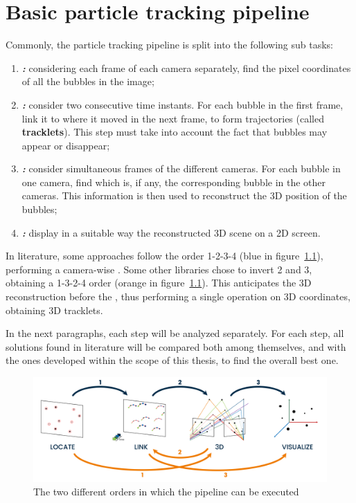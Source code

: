 \chapter{Basic particle tracking pipeline}
\label{chap:basicpipeline}

Commonly, the particle tracking pipeline is split into the following sub tasks:
\begin{enumerate}
	\itemsep 0em
	\item \textbf{\locate*\textit{:}} considering each frame of each camera separately, find the pixel coordinates of all the bubbles in the image;
	\item \textbf{\link*\textit{:}} consider two consecutive time instants. For each bubble in the first frame, link it to where it moved in the next frame, to form trajectories (called \textbf{tracklets}). This step must take into account the fact that bubbles may appear or disappear;
	\item \textbf{\match*\textit{:}} consider simultaneous frames of the different cameras. For each bubble in one camera, find which is, if any, the corresponding bubble in the other cameras. This information is then used to reconstruct the 3D position of the bubbles;
	\item \textbf{\visual*\textit{:}} display in a suitable way the reconstructed 3D scene on a 2D screen.
\end{enumerate}
In literature, some approaches follow the order 1-2-3-4 (blue in figure~\ref{fig:pipeline:order}), performing a camera-wise \link*.
Some other libraries chose to invert 2 and 3, obtaining a 1-3-2-4 order (orange in figure~\ref{fig:pipeline:order}).
This anticipates the 3D reconstruction before the \link*, thus performing a single \link* operation on 3D coordinates, obtaining 3D tracklets.

In the next paragraphs, each step will be analyzed separately.
For each step, all solutions found in literature will be compared both among themselves, and with the ones developed within the scope of this thesis, to find the overall best one.

\begin{figure}[!t]
	\centerline{\includegraphics[width=\textwidth]{images/pipeline-orders.png}}
	\caption{\centering The two different orders in which the pipeline can be executed}
	\label{fig:pipeline:order}
\end{figure}
